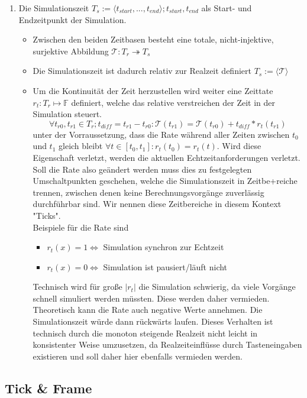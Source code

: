 \begin{enumerate}
\item Die Simulationszeit $T_s:=\langle t_{start}, ... , t_{end}\rangle; t_{start}, t_{end}$ als Start- und Endzeitpunkt der Simulation.
	\begin{itemize}
	\item Zwischen den beiden Zeitbasen besteht eine totale, nicht-injektive, surjektive Abbildung $\mathcal{T}:T_r \twoheadrightarrow T_s$
	\item Die Simulationszeit ist dadurch relativ zur Realzeit definiert $T_s:=\langle\mathcal{T}\rangle$
	\item Um die Kontinuität der Zeit herzustellen wird weiter eine Zeittate $r_t:T_r\mapsto\mathbb{F}$ definiert, welche das relative verstreichen der Zeit in der Simulation steuert. 
	$$\forall t_{r0},  t_{r1} \in T_r ; t_{diff}=t_{r1}-t_{r0} :\mathcal{T}(t_{r1}) = \mathcal{T}(t_{r0}) + t_{diff}*r_t(t_{r1})$$ unter der Vorraussetzung, dass die Rate während aller Zeiten zwischen $t_0$ und $t_1$ gleich bleibt $\forall t \in [t_0,t_1]: r_t(t_0) = r_t(t)$. Wird diese Eigenschaft verletzt, werden die aktuellen Echtzeitanforderungen verletzt. \\
	Soll die Rate also geändert werden muss dies zu festgelegten Umschaltpunkten geschehen, welche die Simulationszeit in Zeitbe+reiche trennen, zwischen denen keine Berechnungsvorgänge zuverlässig durchführbar sind. Wir nennen diese Zeitbereiche in diesem Kontext "Ticks".\\
Beispiele für die Rate sind 
\begin{itemize}
\item $r_t(x) = 1 \Leftrightarrow$ Simulation synchron zur Echtzeit
\item $r_t(x) = 0 \Leftrightarrow$ Simulation ist pausiert/läuft nicht
\end{itemize}
Technisch wird für große $|r_t|$ die Simulation schwierig, da viele Vorgänge schnell simuliert werden müssten. Diese werden daher vermieden.\\
Theoretisch kann die Rate auch negative Werte annehmen. Die Simulationszeit würde dann rückwärts laufen. Dieses Verhalten ist technisch durch die monoton steigende Realzeit nicht leicht in konsistenter Weise umzusetzen, da Realzeiteinflüsse durch Tasteneingaben existieren und soll daher hier ebenfalls vermieden werden.
	\end{itemize}
\end{enumerate}	


\subsection{Tick \& Frame}


